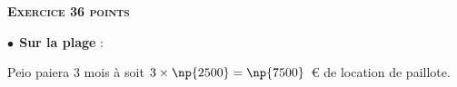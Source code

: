 \textbf{\textsc{Exercice 3\hfill 6 points}}

\medskip

%
%
%
%
%
%
%
%
%
%
%
%
%
%
%
$\bullet~~$\textbf{Sur la plage} :

Peio paiera 3 mois à  soit $3 \times \np{2500} = \np{7500}$~\euro{} de location de paillote.

